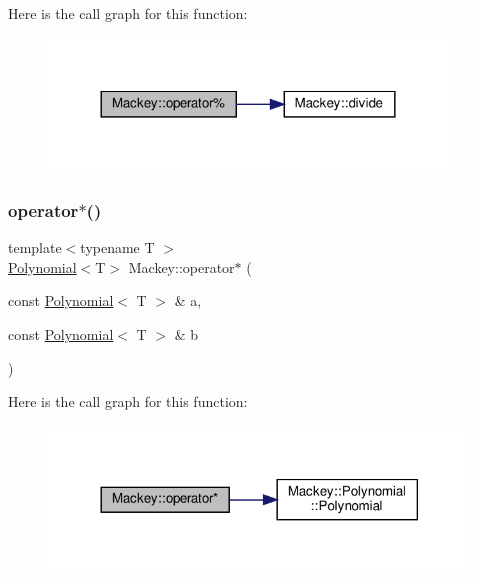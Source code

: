 Here is the call graph for this function\+:\nopagebreak
\begin{figure}[H]
\begin{center}
\leavevmode
\includegraphics[width=300pt]{namespaceMackey_adb145e729d40138080b5a58d26a89388_cgraph}
\end{center}
\end{figure}
\mbox{\label{namespaceMackey_a7bbd83e8170a608aea65f7d916b4bc6d}} 
\subsubsection{\texorpdfstring{operator$\ast$()}{operator*()}\hspace{0.1cm}{\footnotesize\ttfamily [1/2]}}
{\footnotesize\ttfamily template$<$typename T $>$ \\
\hyperlink{classMackey_1_1Polynomial}{Polynomial}$<$T$>$ Mackey\+::operator$\ast$ (\begin{DoxyParamCaption}\item[{const \hyperlink{classMackey_1_1Polynomial}{Polynomial}$<$ T $>$ \&}]{a,  }\item[{const \hyperlink{classMackey_1_1Polynomial}{Polynomial}$<$ T $>$ \&}]{b }\end{DoxyParamCaption})}

Here is the call graph for this function\+:\nopagebreak
\begin{figure}[H]
\begin{center}
\leavevmode
\includegraphics[width=317pt]{namespaceMackey_a7bbd83e8170a608aea65f7d916b4bc6d_cgraph}
\end{center}
\end{figure}
\mbox{\label{namespaceMackey_ae235ee5dd92dc1ca64388b8fbb1b4d75}} 
